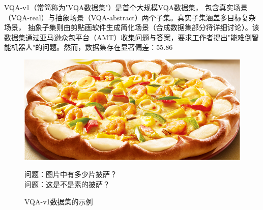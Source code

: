 VQA-v1\cite{Antol2015VQA}（常简称为"VQA数据集"）是首个大规模VQA数据集，
包含真实场景（VQA-real）与抽象场景（VQA-abstract）两个子集。真实子集涵盖多目标复杂场景，
抽象子集则由剪贴画软件生成简化场景（合成数据集部分将详细讨论）。该数据集通过亚马逊众包平台（AMT）收集问题与答案，要求工作者提出"能难倒智能机器人"的问题。然而，数据集存在显著偏差：55.86%
\begin{figure}[h]
    \centering
    \includegraphics[scale=0.4]{figures/example-from-vqa-v1.jpg}
    \begin{center}
        \footnotesize 问题：图片中有多少片披萨？\\
        \footnotesize 问题：这是不是素的披萨？
    \end{center}
    \caption{VQA-v1数据集的示例}
    \label{fig:example-from-vqa-v1}
\end{figure}

